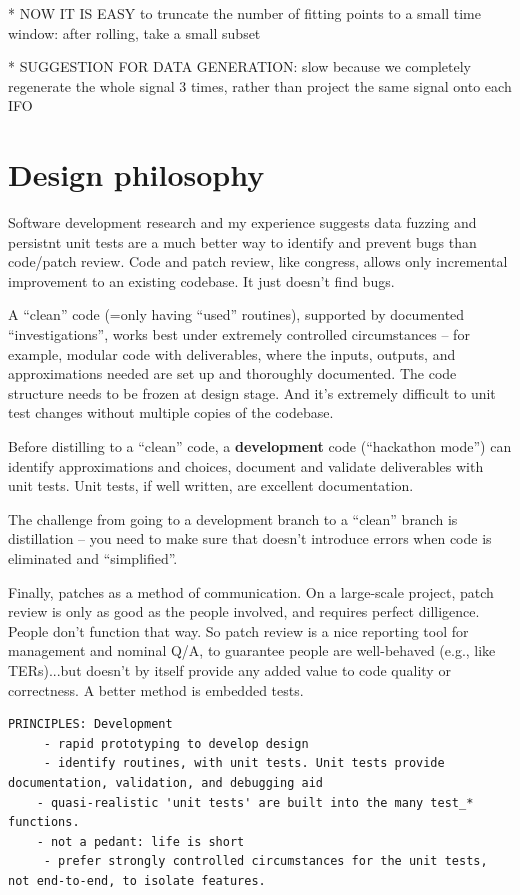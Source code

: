 \documentclass[twocolumn,prd,nofootinbib]{revtex4}
\begin{document}
* NOW IT IS EASY to truncate the number of fitting points to a small time window: after rolling, take a small subset

* SUGGESTION FOR DATA GENERATION: slow because we completely regenerate the whole signal 3 times, rather than
  project the same signal onto each IFO

\section{Design philosophy}

Software development research and my experience suggests data fuzzing and persistnt unit tests are a much better way to
identify and prevent bugs than code/patch review.  Code and patch review, like congress, allows only incremental
improvement to an existing codebase.  It just doesn't find bugs.  

A ``clean'' code (=only having ``used'' routines), supported by documented ``investigations'', works best under
extremely controlled circumstances -- for example, modular code with deliverables, where the inputs, outputs, and
approximations needed are set up and thoroughly documented.  The code structure needs to be frozen at design stage.  
And it's extremely difficult to unit test changes without multiple copies of the codebase.

Before distilling to a ``clean'' code, a \textbf{development} code (``hackathon mode'') can identify approximations and
choices, document and validate deliverables with unit tests.  Unit tests, if well written, are excellent documentation.

The challenge from going to a development branch to a ``clean'' branch is distillation -- you need to make sure that
doesn't introduce errors when code is eliminated and ``simplified''.

Finally, patches as a method of communication.  On a large-scale project, patch review is only as good as the people
involved, and requires perfect dilligence.  People don't function that way.  So patch review is a nice reporting tool
for management and nominal Q/A, to guarantee people are well-behaved (e.g., like TERs)...but doesn't by itself
provide any added value to code quality or correctness.
  A better method is embedded tests.
\begin{verbatim}
PRINCIPLES: Development
     - rapid prototyping to develop design
     - identify routines, with unit tests. Unit tests provide documentation, validation, and debugging aid
	- quasi-realistic 'unit tests' are built into the many test_* functions.
	- not a pedant: life is short
     - prefer strongly controlled circumstances for the unit tests, not end-to-end, to isolate features. 
\end{verbatim}
\end{document}
